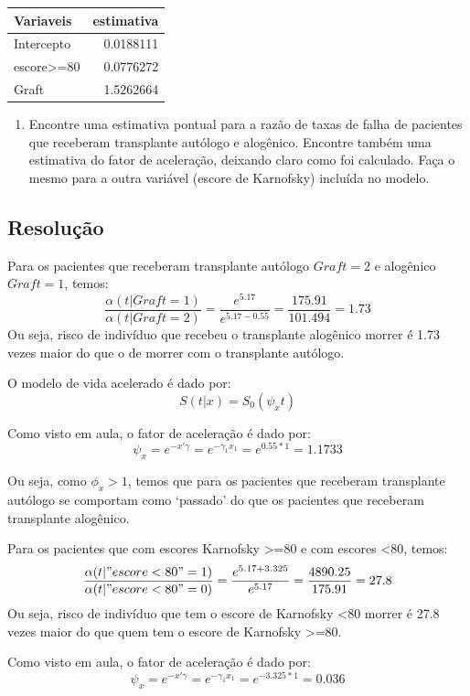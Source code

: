\documentclass[]{article}
\providecommand{\tightlist}{%
  \setlength{\itemsep}{0pt}\setlength{\parskip}{0pt}}
\begin{document}
\begin{longtable}[]{@{}lr@{}}
\toprule
Variaveis & estimativa\tabularnewline
\midrule
\endhead
Intercepto & 0.0188111\tabularnewline
escore\textgreater{}=80 & 0.0776272\tabularnewline
Graft & 1.5262664\tabularnewline
\bottomrule
\end{longtable}

\begin{enumerate}
\def\labelenumi{(\alph{enumi})}
\setcounter{enumi}{2}
\tightlist
\item
  Encontre uma estimativa pontual para a razão de taxas de falha de
  pacientes que receberam transplante autólogo e alogênico. Encontre
  também uma estimativa do fator de aceleração, deixando claro como foi
  calculado. Faça o mesmo para a outra variável (escore de Karnofsky)
  incluída no modelo.
\end{enumerate}

\subsection{Resolução}\label{resolucao-7}

Para os pacientes que receberam transplante autólogo \(Graft=2\) e
alogênico \(Graft=1\), temos:
\[\frac{\alpha(t|Graft=1)}{\alpha(t|Graft=2)}=\frac{e^{5.17}}{e^{5.17-0.55}}=\frac{175.91}{101.494}=1.73\]
Ou seja, risco de indivíduo que recebeu o transplante alogênico morrer é
1.73 vezes maior do que o de morrer com o transplante autólogo.

O modelo de vida acelerado é dado por: \[S(t|x)=S_0(\psi_xt)\]

Como visto em aula, o fator de aceleração é dado por:
\[\psi_x=e^{-x'\gamma}=e^{-\gamma_1x_1}=e^{0.55*1}=1.1733\]

Ou seja, como \(\phi_x>1\), temos que para os pacientes que receberam
transplante autólogo se comportam como `passado' do que os pacientes que
receberam transplante alogênico.

Para os pacientes que com escores Karnofsky \textgreater{}=80 e com
escores \textless{}80, temos:
\[\frac{\alpha(t|"escore<80"=1)}{\alpha(t|"escore<80"=0)}=\frac{e^{5.17+3.325}}{e^{5.17}}=\frac{4890.25}{175.91}=27.8\]
Ou seja, risco de indivíduo que tem o escore de Karnofsky \textless{}80
morrer é 27.8 vezes maior do que quem tem o escore de Karnofsky
\textgreater{}=80.

Como visto em aula, o fator de aceleração é dado por:
\[\psi_x=e^{-x'\gamma}=e^{-\gamma_1x_1}=e^{-3.325*1}=0.036\]
\end{document}
